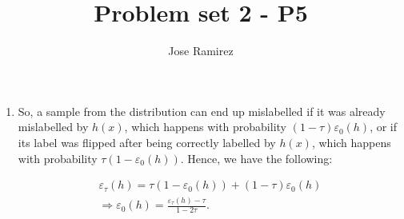 \documentclass{article}
\title{Problem set 2 - P5}
\author{Jose Ramirez}
\begin{document}
\maketitle

\begin{enumerate}
\item So, a sample from the distribution can end up mislabelled if it was already mislabelled by $h(x)$, which happens with probability $(1 - \tau)\varepsilon_{0}(h)$, or if its label was flipped after being correctly labelled by $h(x)$, which happens with probability $\tau(1 - \varepsilon_{0}(h))$. Hence, we have the following: 

\begin{align*}
	\varepsilon_{\tau}(h) = \tau(1 - \varepsilon_0(h)) + (1 - \tau)\varepsilon_0(h) \\
	\Rightarrow \varepsilon_{0}(h) = \frac{\varepsilon_{\tau}(h) - \tau}{1 - 2\tau}.
\end{align*}

\end{enumerate}
\end{document}

